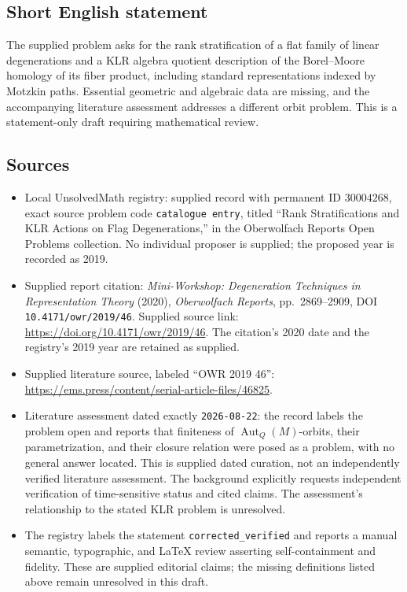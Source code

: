 \documentclass[11pt]{article}
\begin{document}
\subsection{Short English statement}
The supplied problem asks for the rank stratification of a flat family of linear degenerations and a KLR algebra quotient description of the Borel--Moore homology of its fiber product, including standard representations indexed by Motzkin paths. Essential geometric and algebraic data are missing, and the accompanying literature assessment addresses a different orbit problem. This is a statement-only draft requiring mathematical review.
\subsection{Sources}
\begin{itemize}
\item Local UnsolvedMath registry: supplied record with permanent ID \(30004268\), exact source problem code \texttt{catalogue entry}, titled ``Rank Stratifications and KLR Actions on Flag Degenerations,'' in the Oberwolfach Reports Open Problems collection. No individual proposer is supplied; the proposed year is recorded as 2019.
\item Supplied report citation: \emph{Mini-Workshop: Degeneration Techniques in Representation Theory} (2020), \emph{Oberwolfach Reports}, pp.~2869--2909, DOI \texttt{10.4171/owr/2019/46}. Supplied source link: \url{https://doi.org/10.4171/owr/2019/46}. The citation's 2020 date and the registry's 2019 year are retained as supplied.
\item Supplied literature source, labeled ``OWR 2019 46'': \url{https://ems.press/content/serial-article-files/46825}.
\item Literature assessment dated exactly \texttt{2026-08-22}: the record labels the problem open and reports that finiteness of \(\operatorname{Aut}_Q(M)\)-orbits, their parametrization, and their closure relation were posed as a problem, with no general answer located. This is supplied dated curation, not an independently verified literature assessment. The background explicitly requests independent verification of time-sensitive status and cited claims. The assessment's relationship to the stated KLR problem is unresolved.
\item The registry labels the statement \texttt{corrected\_verified} and reports a manual semantic, typographic, and LaTeX review asserting self-containment and fidelity. These are supplied editorial claims; the missing definitions listed above remain unresolved in this draft.
\end{itemize}
\end{document}
